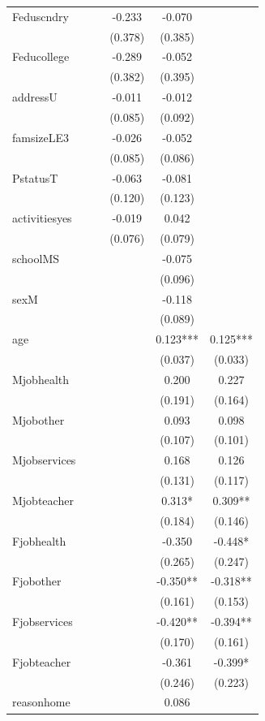\documentclass[12pt,english]{article}
\begin{document}
\begin{longtable}[c]{lccccc}
Feduscndry &  &  & -0.233 & -0.070 & \\
 &  &  & (0.378) & (0.385) & \\
Feducollege &  &  & -0.289 & -0.052 & \\
 &  &  & (0.382) & (0.395) & \\
addressU &  &  & -0.011 & -0.012 & \\
 &  &  & (0.085) & (0.092) & \\
famsizeLE3 &  &  & -0.026 & -0.052 & \\
 &  &  & (0.085) & (0.086) & \\
PstatusT &  &  & -0.063 & -0.081 & \\
 &  &  & (0.120) & (0.123) & \\
activitiesyes &  &  & -0.019 & 0.042 & \\
 &  &  & (0.076) & (0.079) & \\
schoolMS &  &  &  & -0.075 & \\
 &  &  &  & (0.096) & \\
sexM &  &  &  & -0.118 & \\
 &  &  &  & (0.089) & \\
age &  &  &  & 0.123*** & 0.125***\\
 &  &  &  & (0.037) & (0.033)\\
Mjobhealth &  &  &  & 0.200 & 0.227\\
 &  &  &  & (0.191) & (0.164)\\
Mjobother &  &  &  & 0.093 & 0.098\\
 &  &  &  & (0.107) & (0.101)\\
Mjobservices &  &  &  & 0.168 & 0.126\\
 &  &  &  & (0.131) & (0.117)\\
Mjobteacher &  &  &  & 0.313* & 0.309**\\
 &  &  &  & (0.184) & (0.146)\\
Fjobhealth &  &  &  & -0.350 & -0.448*\\
 &  &  &  & (0.265) & (0.247)\\
Fjobother &  &  &  & -0.350** & -0.318**\\
 &  &  &  & (0.161) & (0.153)\\
Fjobservices &  &  &  & -0.420** & -0.394**\\
 &  &  &  & (0.170) & (0.161)\\
Fjobteacher &  &  &  & -0.361 & -0.399*\\
 &  &  &  & (0.246) & (0.223)\\
reasonhome &  &  &  & 0.086 & \\

\end{longtable}
\end{document}
